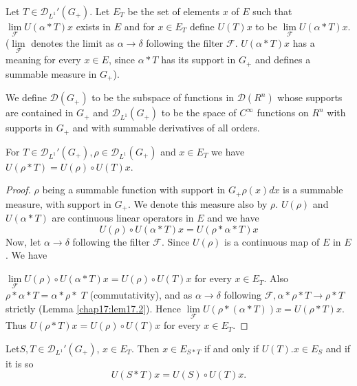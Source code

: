 \begin{definition}\label{chap19:def19.4}
Let $T \in \mathscr{D}_{L^1}'(G_+)$. Let $E_T$ be the set of elements
$x$ of $E$ such that $\lim\limits_{\mathscr{F}}U(\alpha *T)x$ exists
in $E$ and for $x \in E_T$ define $U(T)x$ to be
$\lim\limits_{\mathscr{F}}U(\alpha
*T)x$. ($\lim\limits_{\mathscr{F}}$ denotes the limit as $\alpha \to
\delta$ following the filter $\mathscr{F}$. $U(\alpha *T)x$ has a
meaning for every $x\in E$, since $\alpha *T$ has its support in $G_+$
and defines a summable measure in $G_+$). 
\end{definition}

\begin{definition}\label{chap19:def19.5}
We define $\mathscr{D}(G_+)$ to be the subspace of functions in
$\mathscr{D}(R^n)$ whose supports are contained in $G_+$ and
$\mathscr{D}_{L^1}(G_+)$ to be the space of $C^\infty$ functions on
$R^n$ with supports in $G_+$ and with summable derivatives of all orders.
\end{definition}

\setcounter{section}{19}
\setcounter{prop}{0}
\begin{prop}\label{chap19:prop19.1}
For $T\in\mathscr{D}_{L^1}'(G_+),\rho\in\mathscr{D}_{L^1}(G_+)$ and
$x\in E_T$ we have $U(\rho *T)=U(\rho)\circ U(T)x$.
\end{prop}

\begin{proof}
$\rho$ being a summable function with support in $G_+\rho(x)dx$ is a
  summable measure, with support in $G_+$. We denote this measure also
  by $\rho$. $U(\rho)$ and $U(\alpha *T)$ are continuous linear
  operators in $E$ and we have 
$$
U(\rho)\circ U(\alpha *T)x=U(\rho *\alpha * T)x
$$
Now, let $\alpha \to \delta$ following the filter $\mathscr{F}$. Since
$U(\rho)$ is a continuous map of $E$ in $E$. We have 

$\lim\limits_{\mathscr{F}}U(\rho)\circ U(\alpha * T)x=U(\rho)\circ
U(T)x$ for every $x\in E_T$. Also $\rho *\alpha *T=\alpha *\rho * \;
T$ (commutativity), and as $\alpha \to \delta$ following $\mathscr{F},
\alpha *\rho *T \to \rho *T$ strictly (Lemma
\ref{chap17:lem17.2}). Hence $\lim\limits_{\mathscr{F}}U(\rho *(\alpha
  *T))x =U(\rho *T)x$. Thus $U(\rho *T)x=U(\rho)\circ U(T)x$ for every
  $x\in E_T$. 
\end{proof}

\begin{propspl*}\label{chap19:prop19.1'}
Let\pageoriginale $S, T\in\mathscr{D}_{L^1}'(G_+)$, $x\in
  E_T$. Then $x\in E_{S*T}$ if and only if $U(T).x\in E_S$ and if it
is so 
$$
U(S*T)x=U(S)\circ U(T)x.
$$
\end{propspl*}


